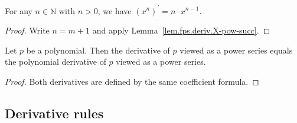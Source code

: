 \begin{lemma}
\label{lem.fps.deriv.X-pow-pos}
\leanhelper
\leanok
For any $n\in\mathbb{N}$ with $n > 0$, we have
$\left(x^{n}\right)^{\prime} = n \cdot x^{n-1}$.
\end{lemma}

\begin{proof}
\leanok
Write $n = m + 1$ and apply Lemma~\ref{lem.fps.deriv.X-pow-succ}.
\end{proof}

\begin{lemma}
\label{lem.fps.deriv.coe-polynomial}
\leanhelper
\leanok
Let $p$ be a polynomial. Then the derivative of $p$ viewed as a power series
equals the polynomial derivative of $p$ viewed as a power series.
\end{lemma}

\begin{proof}
\leanok
Both derivatives are defined by the same coefficient formula.
\end{proof}

\subsection{Derivative rules}

